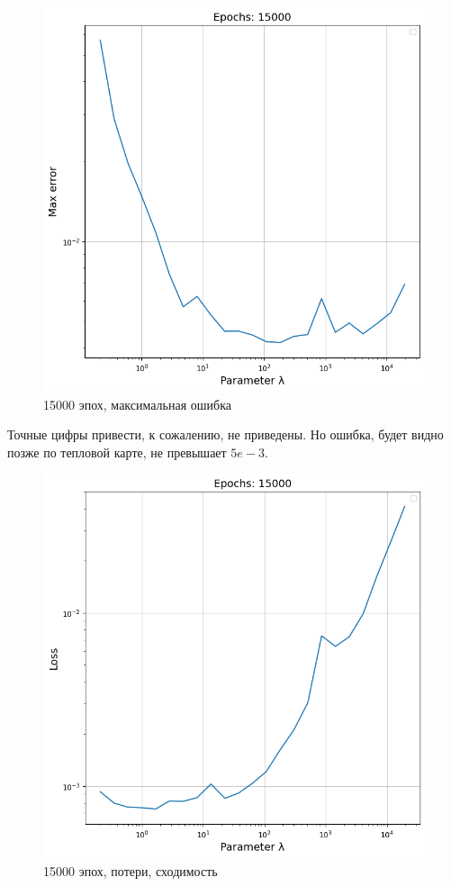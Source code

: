 \begin{figure}[ht!]
    \centering
    \includegraphics[width=0.9\hsize]{images/2.png}
    \caption{15000 эпох, максимальная ошибка}
\end{figure}

Точные цифры привести, к сожалению, не приведены. Но ошибка, будет видно позже по тепловой карте, не превышает $5e-3$.

\begin{figure}[ht!]
    \centering
    \includegraphics[width=0.9\hsize]{images/6.png}
    \caption{15000 эпох, потери, сходимость}
\end{figure}


